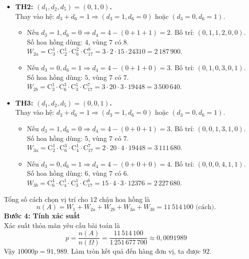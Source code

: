 \begin{ex}
{\begin{itemize}
			Vậy bộ $(d_1, d_2, d_3, d_4, d_5, d_6) = (1, 0, 0, 3, 0, 0)$. Số hoa hồng đã dùng là $4$, còn $8$ hoa hồng xếp vào vùng $7$.\\
			Số cách chọn ô: $W_1 = \mathrm{C}_1^1 \cdot \mathrm{C}_3^0 \cdot \mathrm{C}_2^0 \cdot \mathrm{C}_6^3 \cdot \mathrm{C}_4^0 \cdot \mathrm{C}_3^0 \cdot \mathrm{C}_{17}^8 = 1 \cdot 20 \cdot 24310 = 486\,200$.
			\item \textbf{TH2: $(d_1, d_2, d_5) = (0, 1, 0)$.}\\
			Thay vào hệ: $d_3 + d_6 = 1 \Rightarrow (d_3=1, d_6=0)$ hoặc $(d_3=0, d_6=1)$.
			\begin{itemize}
				\item Nếu $d_3=1, d_6=0 \Rightarrow d_4 = 4 - (0+1+1) = 2$. Bố trí: $(0, 1, 1, 2, 0, 0)$. Số hoa hồng dùng: $4$, vùng $7$ có $8$.\\
				$W_{2a} = \mathrm{C}_3^1 \cdot \mathrm{C}_2^1 \cdot \mathrm{C}_6^2 \cdot \mathrm{C}_{17}^8 = 3 \cdot 2 \cdot 15 \cdot 24310 = 2\,187\,900$.
				\item Nếu $d_3=0, d_6=1 \Rightarrow d_4 = 4 - (0+1+0) = 3$. Bố trí: $(0, 1, 0, 3, 0, 1)$. Số hoa hồng dùng: $5$, vùng $7$ có $7$.\\
				$W_{2b} = \mathrm{C}_3^1 \cdot \mathrm{C}_6^3 \cdot \mathrm{C}_3^1 \cdot \mathrm{C}_{17}^7 = 3 \cdot 20 \cdot 3 \cdot 19448 = 3\,500\,640$.
			\end{itemize}
			\item \textbf{TH3: $(d_1, d_2, d_5) = (0, 0, 1)$.}\\
			Thay vào hệ: $d_3 + d_6 = 1 \Rightarrow (d_3=1, d_6=0)$ hoặc $(d_3=0, d_6=1)$.
			\begin{itemize}
				\item Nếu $d_3=1, d_6=0 \Rightarrow d_4 = 4 - (0+0+1) = 3$. Bố trí: $(0, 0, 1, 3, 1, 0)$. Số hoa hồng dùng: $5$, vùng $7$ có $7$.\\
				$W_{3a} = \mathrm{C}_2^1 \cdot \mathrm{C}_6^3 \cdot \mathrm{C}_4^1 \cdot \mathrm{C}_{17}^7 = 2 \cdot 20 \cdot 4 \cdot 19448 = 3\,111\,680$.
				\item Nếu $d_3=0, d_6=1 \Rightarrow d_4 = 4 - (0+0+0) = 4$. Bố trí: $(0, 0, 0, 4, 1, 1)$. Số hoa hồng dùng: $6$, vùng $7$ có $6$.\\
				$W_{3b} = \mathrm{C}_6^4 \cdot \mathrm{C}_4^1 \cdot \mathrm{C}_3^1 \cdot \mathrm{C}_{17}^6 = 15 \cdot 4 \cdot 3 \cdot 12376 = 2\,227\,680$.
			\end{itemize}
		\end{itemize}
		Tổng số cách chọn vị trí cho $12$ chậu hoa hồng là
		$$n(A) = W_1 + W_{2a} + W_{2b} + W_{3a} + W_{3b} = 11\,514\,100 \text{ (cách)}.$$
		\textbf{Bước 4: Tính xác suất}\\
		Xác suất thỏa mãn yêu cầu bài toán là
		$$p = \dfrac{n(A)}{n(\Omega)} = \dfrac{11\,514\,100}{1\,251\,677\,700} \approx 0,0091989$$
		Vậy $10000p = 91,989$. Làm tròn kết quả đến hàng đơn vị, ta được $\boxed{92}$.
	}
\end{ex}